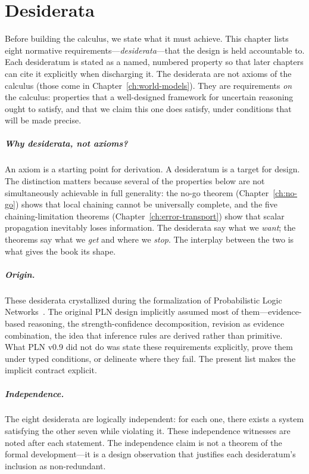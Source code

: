 \chapter{Desiderata}
\label{ch:desiderata}

Before building the calculus, we state what it must achieve.  This
chapter lists eight normative requirements---\emph{desiderata}---that
the design is held accountable to.  Each desideratum is stated as a
named, numbered property so that later chapters can cite it explicitly
when discharging it.  The desiderata are not axioms of the calculus
(those come in Chapter~\ref{ch:world-models}).  They are requirements
\emph{on} the calculus: properties that a well-designed framework for
uncertain reasoning ought to satisfy, and that we claim this one does
satisfy, under conditions that will be made precise.

\paragraph{Why desiderata, not axioms?}
An axiom is a starting point for derivation.  A desideratum is a
target for design.  The distinction matters because several of the
properties below are not simultaneously achievable in full generality:
the no-go theorem (Chapter~\ref{ch:no-go}) shows that local chaining
cannot be universally complete, and the five chaining-limitation
theorems (Chapter~\ref{ch:error-transport}) show that scalar
propagation inevitably loses information.  The desiderata say what
we \emph{want}; the theorems say what we \emph{get} and where we
\emph{stop}.  The interplay between the two is what gives the book
its shape.

\paragraph{Origin.}
These desiderata crystallized during the formalization of Probabilistic
Logic Networks~\cite{goertzel2009pln}.  The original PLN design
implicitly assumed most of them---evidence-based reasoning, the
strength-confidence decomposition, revision as evidence combination,
the idea that inference rules are derived rather than primitive.  What
PLN v0.9 did not do was state these requirements explicitly, prove them
under typed conditions, or delineate where they fail.  The present list
makes the implicit contract explicit.

\paragraph{Independence.}
The eight desiderata are logically independent: for each one, there
exists a system satisfying the other seven while violating it.  These
independence witnesses are noted after each statement.  The
independence claim is not a theorem of the formal development---it is a
design observation that justifies each desideratum's inclusion as
non-redundant.

